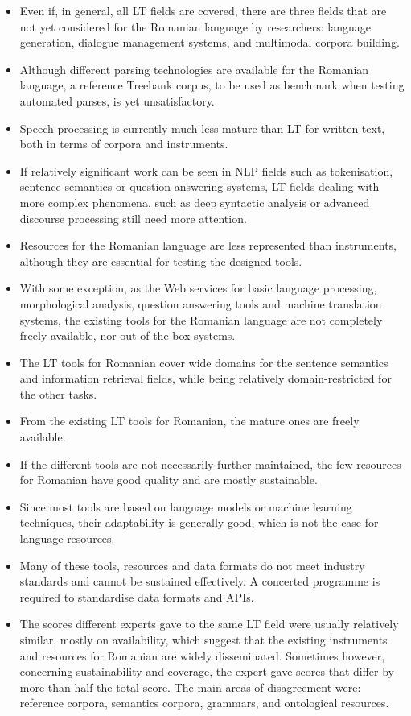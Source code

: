 \begin{multicols}{2}
\begin{itemize}
\item Even if, in general, all LT fields are covered, there are three fields that are not yet considered for the Romanian language by researchers: language generation, dialogue management systems, and multimodal corpora building.
\item Although different parsing technologies are available for the Romanian language, a reference Treebank corpus, to be used as benchmark when testing automated parses, is yet unsatisfactory.
\item Speech processing is currently much less mature than LT for written text, both in terms of corpora and instruments.
\item If relatively significant work can be seen in NLP fields such as tokenisation, sentence semantics or question answering systems, LT fields dealing with more complex phenomena, such as deep syntactic analysis or advanced discourse processing still need more attention.
\item Resources for the Romanian language are less represented than instruments, although they are essential for testing the designed tools.
\item With some exception, as the Web services for basic language processing, morphological analysis, question answering tools and machine translation systems, the existing tools for the Romanian language are not completely freely available, nor out of the box systems. 
\item The LT tools for Romanian cover wide domains for the sentence semantics and information retrieval fields, while being relatively domain-restricted for the other tasks.
\item From the existing LT tools for Romanian, the mature ones are freely available.
\item If the different tools are not necessarily further maintained, the few resources for Romanian have good quality and are mostly sustainable.
\item Since most tools are based on language models or machine learning techniques, their adaptability is generally good, which is not the case for language resources.
\item Many of these tools, resources and data formats do not meet industry standards and cannot be sustained effectively. A concerted programme is required to standardise data formats and APIs.
\item The scores different experts gave to the same LT field were usually relatively similar, mostly on availability, which suggest that the existing instruments and resources for Romanian are widely disseminated. Sometimes however, concerning sustainability and coverage, the expert gave scores that differ by more than half the total score. The main areas of disagreement were: reference corpora, semantics corpora, grammars, and ontological resources. 

\end{itemize}
\end{multicols}
